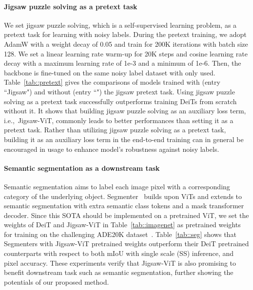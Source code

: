 \documentclass{article}
\begin{document}
\paragraph{{Jigsaw puzzle solving as a pretext task}}
We set jigsaw puzzle solving, which is a self-supervised learning problem, as a pretext task for learning with noisy labels.
During the pretext training, we adopt AdamW with a weight decay of 0.05 and train for 200K iterations with batch size 128.
We set a linear learning rate warm-up for 20K steps and cosine learning rate decay with a maximum learning rate of 1e-3 and a minimum of 1e-6.
Then, the backbone is fine-tuned on the same noisy label dataset with only  used.
Table~\ref{tab::pretext} gives the comparisons of models trained with (entry ``Jigsaw") and without (entry ``\xmark") the jigsaw pretext task.
Using jigsaw puzzle solving as a pretext task successfully outperforms training DeiTs from scratch without it.
It shows that building jigsaw puzzle solving as an auxiliary loss term, i.e.,~Jigsaw-ViT, commonly leads to better performances than 
setting it as a pretext task.
Rather than utilizing jigsaw puzzle solving as a pretext task, building it as an auxiliary loss term in the end-to-end training can in general be encouraged in usage to enhance model's robustness against noisy labels.

\paragraph{{Semantic segmentation as a downstream task}}
{Semantic segmentation aims to label each image pixel with a corresponding category of the underlying object.
Segmenter~\cite{strudel2021segmenter} builds upon ViTs and extends to semantic segmentation with extra semantic class tokens and a mask transformer decoder.
Since this SOTA should be implemented on a pretrained ViT, we set the weights of DeiT and Jigsaw-ViT in Table~\ref{tab::imagenet} as pretrained weights for training on the challenging ADE20K dataset~\cite{zhou2019semantic}. 
Table~\ref{tab::seg} shows that Segmenters with Jigsaw-ViT pretrained weights outperform their DeiT pretrained counterparts with respect to both mIoU with single scale (SS) inference, and pixel accuracy.
These experiments verify that Jigsaw-ViT is also promising to benefit downstream task such as semantic segmentation, further showing the potentials of our proposed method.}
\end{document}

